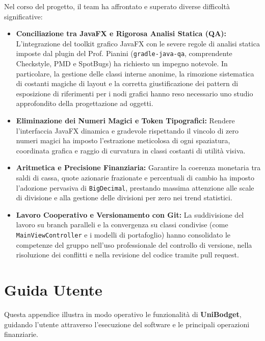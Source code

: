 \documentclass[11pt,a4paper,openright]{report}
\begin{document}
Nel corso del progetto, il team ha affrontato e superato diverse difficoltà significative:
\begin{itemize}[noitemsep,topsep=2pt]
  \item \textbf{Conciliazione tra JavaFX e Rigorosa Analisi Statica (QA):} L'integrazione del toolkit grafico JavaFX con le severe regole di analisi statica imposte dal plugin del Prof. Pianini (\texttt{gradle-java-qa}, comprendente Checkstyle, PMD e SpotBugs) ha richiesto un impegno notevole. In particolare, la gestione delle classi interne anonime, la rimozione sistematica di costanti magiche di layout e la corretta giustificazione dei pattern di esposizione di riferimenti per i nodi grafici hanno reso necessario uno studio approfondito della progettazione ad oggetti.
  \item \textbf{Eliminazione dei Numeri Magici e Token Tipografici:} Rendere l'interfaccia JavaFX dinamica e gradevole rispettando il vincolo di zero numeri magici ha imposto l'estrazione meticolosa di ogni spaziatura, coordinata grafica e raggio di curvatura in classi costanti di utilità visiva.
  \item \textbf{Aritmetica e Precisione Finanziaria:} Garantire la coerenza monetaria tra saldi di cassa, quote azionarie frazionate e percentuali di cambio ha imposto l'adozione pervasiva di \texttt{BigDecimal}, prestando massima attenzione alle scale di divisione e alla gestione delle divisioni per zero nei trend statistici.
  \item \textbf{Lavoro Cooperativo e Versionamento con Git:} La suddivisione del lavoro su branch paralleli e la convergenza su classi condivise (come \texttt{MainViewController} e i modelli di portafoglio) hanno consolidato le competenze del gruppo nell'uso professionale del controllo di versione, nella risoluzione dei conflitti e nella revisione del codice tramite pull request.
\end{itemize}

\appendix
\chapter{Guida Utente}

Questa appendice illustra in modo operativo le funzionalità di \textbf{UniBodget}, guidando l'utente attraverso l'esecuzione del software e le principali operazioni finanziarie.
\end{document}
